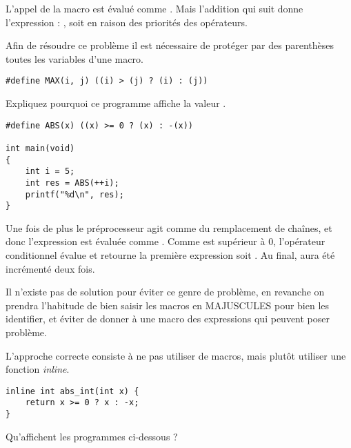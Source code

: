 \documentclass[french,a4paper,addpoints,11pt]{exam}
\begin{document}
\begin{multicols}{2}
\begin{questions}
\ifprintanswers
\begin{solution}
L'appel de la macro  est évalué comme . Mais l'addition qui suit donne l'expression : , soit  en raison des priorités des opérateurs.

Afin de résoudre ce problème il est nécessaire de protéger par des parenthèses toutes les variables d'une macro.

\begin{lstlisting}
#define MAX(i, j) ((i) > (j) ? (i) : (j))
\end{lstlisting}
\end{solution}
\fi

\question
Expliquez pourquoi ce programme affiche la valeur .

\begin{lstlisting}
#define ABS(x) ((x) >= 0 ? (x) : -(x))

int main(void)
{
    int i = 5;
    int res = ABS(++i);
    printf("%d\n", res);
}
\end{lstlisting}

\ifprintanswers
\begin{solution}
Une fois de plus le préprocesseur agit comme du remplacement de chaînes, et donc l'expression  est évaluée comme . Comme  est supérieur à 0, l'opérateur conditionnel évalue et retourne la première expression soit . Au final,  aura été incrémenté deux fois.

Il n'existe pas de solution pour éviter ce genre de problème, en revanche on prendra l'habitude de bien saisir les macros en MAJUSCULES pour bien les identifier, et éviter de donner à une macro des expressions qui peuvent poser problème.

L'approche correcte consiste à ne pas utiliser de macros, mais plutôt utiliser une fonction \emph{inline}.

\begin{lstlisting}
inline int abs_int(int x) {
    return x >= 0 ? x : -x;
}
\end{lstlisting}
\end{solution}
\fi

\question Qu'affichent les programmes ci-dessous ?

\end{questions}
\end{multicols}
\end{document}

